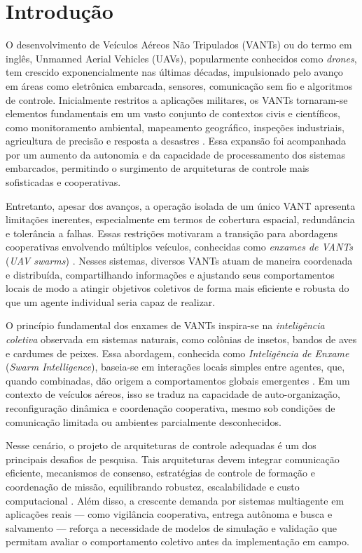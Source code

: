
\section{Introdução}
\label{sec:intro}

O desenvolvimento de Veículos Aéreos Não Tripulados (VANTs) ou do termo em inglês, Unmanned Aerial Vehicles (UAVs), popularmente conhecidos como \textit{drones}, tem crescido exponencialmente nas últimas décadas, impulsionado pelo avanço em áreas como eletrônica embarcada, sensores, comunicação sem fio e algoritmos de controle. Inicialmente restritos a aplicações militares, os VANTs tornaram-se elementos fundamentais em um vasto conjunto de contextos civis e científicos, como monitoramento ambiental, mapeamento geográfico, inspeções industriais, agricultura de precisão e resposta a desastres \citep{chung2018survey, hong2020swarm}. Essa expansão foi acompanhada por um aumento da autonomia e da capacidade de processamento dos sistemas embarcados, permitindo o surgimento de arquiteturas de controle mais sofisticadas e cooperativas.

Entretanto, apesar dos avanços, a operação isolada de um único VANT apresenta limitações inerentes, especialmente em termos de cobertura espacial, redundância e tolerância a falhas. Essas restrições motivaram a transição para abordagens cooperativas envolvendo múltiplos veículos, conhecidas como \textit{enxames de VANTs} (\textit{UAV swarms}) \citep{bu2024advancement}. Nesses sistemas, diversos VANTs atuam de maneira coordenada e distribuída, compartilhando informações e ajustando seus comportamentos locais de modo a atingir objetivos coletivos de forma mais eficiente e robusta do que um agente individual seria capaz de realizar.

O princípio fundamental dos enxames de VANTs inspira-se na \textit{inteligência coletiva} observada em sistemas naturais, como colônias de insetos, bandos de aves e cardumes de peixes. Essa abordagem, conhecida como \textit{Inteligência de Enxame} (\textit{Swarm Intelligence}), baseia-se em interações locais simples entre agentes, que, quando combinadas, dão origem a comportamentos globais emergentes \citep{ren2007consensus, chung2018survey}. Em um contexto de veículos aéreos, isso se traduz na capacidade de auto-organização, reconfiguração dinâmica e coordenação cooperativa, mesmo sob condições de comunicação limitada ou ambientes parcialmente desconhecidos.

Nesse cenário, o projeto de arquiteturas de controle adequadas é um dos principais desafios de pesquisa. Tais arquiteturas devem integrar comunicação eficiente, mecanismos de consenso, estratégias de controle de formação e coordenação de missão, equilibrando robustez, escalabilidade e custo computacional \citep{ouyang2023formation, bu2024advancement}. Além disso, a crescente demanda por sistemas multiagente em aplicações reais — como vigilância cooperativa, entrega autônoma e busca e salvamento — reforça a necessidade de modelos de simulação e validação que permitam avaliar o comportamento coletivo antes da implementação em campo.

